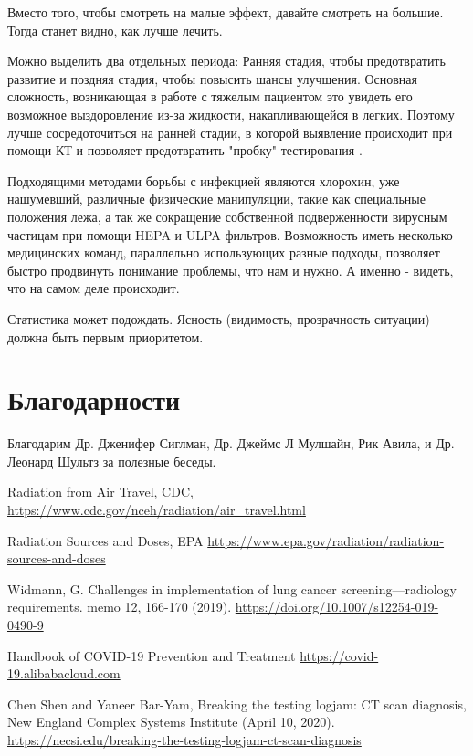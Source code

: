 \documentclass[onecolumn,journal]{IEEEtran}
\begin{document}
\begin{multicols}{2}

Вместо того, чтобы смотреть на малые эффект, давайте смотреть на большие. Тогда станет видно, как лучше лечить.

Можно выделить два отдельных периода: Ранняя стадия, чтобы предотвратить развитие и поздняя стадия, чтобы повысить шансы улучшения. Основная сложность, возникающая в работе с тяжелым пациентом это увидеть его возможное выздоровление из-за  жидкости, накапливающейся в легких. Поэтому лучше сосредоточиться на ранней стадии, в которой выявление происходит при помощи КТ и позволяет предотвратить "пробку" тестирования  \cite{china,cttest}.

Подходящими методами борьбы с инфекцией являются хлорохин, уже нашумевший, различные физические манипуляции, такие как специальные положения лежа, а так же сокращение собственной подверженности вирусным частицам при помощи HEPA и ULPA фильтров. Возможность иметь несколько медицинских команд, параллельно использующих разные подходы, позволяет быстро продвинуть понимание проблемы, что нам и нужно. А именно - видеть, что на самом деле происходит.

Статистика может подождать. Ясность (видимость, прозрачность ситуации) должна быть первым приоритетом.

\section*{Благодарности}
Благодарим Др. Дженифер Сиглман, Др. Джеймс Л Мулшайн, Рик Авила, и Др. Леонард Шультз за полезные беседы.

\end{multicols}
\begin{thebibliography}{20}

 Radiation from Air Travel, CDC, \url{https://www.cdc.gov/nceh/radiation/air_travel.html}

 Radiation Sources and Doses, EPA \url{https://www.epa.gov/radiation/radiation-sources-and-doses}

 Widmann, G. Challenges in implementation of lung cancer screening---radiology requirements. memo 12, 166-170 (2019). \url{https://doi.org/10.1007/s12254-019-0490-9}

  Handbook of COVID-19 Prevention and Treatment \url{https://covid-19.alibabacloud.com}

 Chen Shen and Yaneer Bar-Yam, Breaking the testing logjam: CT scan diagnosis, New England Complex Systems Institute (April 10, 2020). \url{https://necsi.edu/breaking-the-testing-logjam-ct-scan-diagnosis}

\end{thebibliography}
% 
\end{document}
